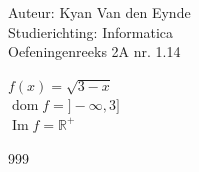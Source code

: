 \documentclass[a4paper]{article}
\begin{document}
  
\noindent \large Auteur: Kyan Van den Eynde \\
\noindent \large Studierichting: Informatica\\
\noindent \large Oefeningenreeks 2A nr. 1.14\\

\medskip

\normalsize

$f(x)=\sqrt{3-x}$\\

$\operatorname{dom} f = ]-\infty,3]$\\

$\operatorname {Im} f = \mathbb{R}^+$\\

\begin{thebibliography}{999}
\end{thebibliography}
\end{document}
